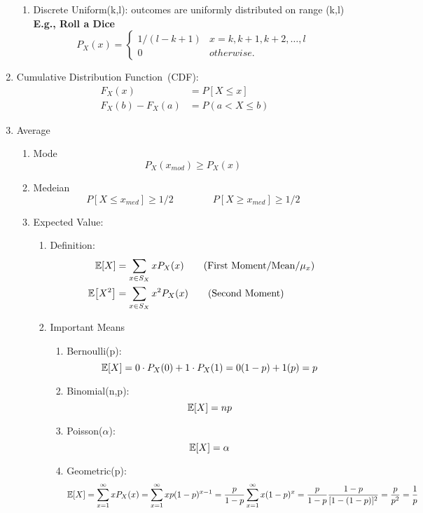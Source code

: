 \begin{enumerate}
{\begin{enumerate}
{            }
            \item Discrete Uniform(k,l): outcomes are uniformly distributed on range (k,l) \textbf{E.g., Roll a Dice}{
                \[ P_X(x) = 
                \begin{cases}
                    1/(l-k+1)   & x=k,k+1,k+2,\ldots,l \\
                    0   & otherwise.
                \end{cases} \]
            }            
        \end{enumerate}
    }
    \item Cumulative Distribution Function~(CDF): {
        \begin{align*}
            F_X(x)&=P[X\leq x] \\
            F_X(b)-F_X(a)&=P(a<X\leq b)
        \end{align*}
    }
    \item Average{
        \begin{enumerate}
            \item Mode $$P_X(x_{mod})\geq P_X(x)$$
            \item Medeian $$P[X\leq x_{med}]\geq 1/2 \qquad \qquad P[X\geq x_{med}]\geq 1/2$$
            \item Expected Value: {
                \begin{enumerate}
                    \item Definition:{
                        \begin{align}
                            \E{X}&=\sum_{x\in S_X}xP_X(x) \tag{First Moment/Mean/$\mu_x$}\\
                            \E{X^2}&=\sum_{x\in S_X}x^2P_X(x) \tag{Second Moment}
                        \end{align}
                    }
                    \item Important Means{
                        \begin{enumerate}
                            \item Bernoulli(p): $$\E{X}=0\cdot P_X(0)+1\cdot P_X(1)=0(1-p)+1(p)=p$$
                            \item Binomial(n,p): $$\E{X}=np$$
                            \item Poisson($\alpha$): $$\E{X}=\alpha$$
                            \item Geometric(p): $$\E{X}=\sum_{x=1}^{\infty}xP_X(x)=\sum_{x=1}^{\infty}xp(1-p)^{x-1}=\dfrac{p}{1-p}\sum_{x=1}^{\infty}x(1-p)^x=\dfrac{p}{1-p}\dfrac{1-p}{[1-(1-p)]^2}=\dfrac{p}{p^2}=\dfrac{1}{p}$$

\end{enumerate}}
\end{enumerate}}
\end{enumerate}}
\end{enumerate}
